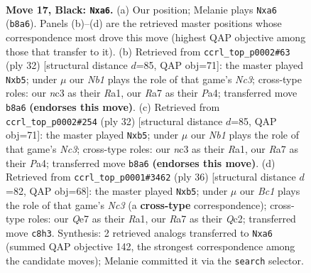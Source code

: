 \documentclass[11pt]{article}
\begin{document}
\clearpage

\begin{figure}[p]\centering
\begin{subfigure}{0.46\textwidth}\centering
\resizebox{\linewidth}{!}{%
\newchessgame
\chessboard[
  setfen={1nb2rk1/r3qpp1/Pp1p1n2/4p2p/P3P3/2NB1N2/2PQ1PPP/R4RK1 b - - 0 17},
  showmover=false,
  pgfstyle=straightmove, color=movearrow, markmove={b8-a6}
]}
\caption{}
\end{subfigure}\hfill
\begin{subfigure}{0.46\textwidth}\centering
\resizebox{\linewidth}{!}{%
\newchessgame
\chessboard[
  setfen={r4rk1/1p2qppp/3nbn2/pp1p4/P2P4/2NBPN1P/2Q2PP1/R4RK1 w - - 0 17},
  showmover=false,
  pgfstyle=straightmove, color=movearrow, markmove={c3-b5}
]}
\caption{}
\end{subfigure}
\\[4pt]
\begin{subfigure}{0.46\textwidth}\centering
\resizebox{\linewidth}{!}{%
\newchessgame
\chessboard[
  setfen={r4rk1/1p2qppp/3nbn2/pp1p4/P2P4/2NBPN1P/2Q2PP1/R4RK1 w - - 0 17},
  showmover=false,
  pgfstyle=straightmove, color=movearrow, markmove={c3-b5}
]}
\caption{}
\end{subfigure}\hfill
\begin{subfigure}{0.46\textwidth}\centering
\resizebox{\linewidth}{!}{%
\newchessgame
\chessboard[
  setfen={r4rk1/pp2q1pp/3nb3/1p3p2/P2Pp3/2N1P3/2QN1PPP/R1R3K1 w - - 0 19},
  showmover=false,
  pgfstyle=straightmove, color=movearrow, markmove={c3-b5}
]}
\caption{}
\end{subfigure}
\caption{\textbf{Move 17, Black: \texttt{Nxa6}.} (a) Our position; Melanie plays \texttt{Nxa6} (\texttt{b8a6}). Panels (b)--(d) are the retrieved master positions whose correspondence most drove this move (highest QAP objective among those that transfer to it). (b) Retrieved from \texttt{ccrl\_top\_p0002\#63} (ply 32) [structural distance $d$=85, QAP obj=71]: the master played \texttt{Nxb5}; under $\mu$ our \emph{Nb1} plays the role of that game's \emph{Nc3}; cross-type roles: our \emph{n}c3 as their \emph{R}a1, our \emph{R}a7 as their \emph{P}a4; transferred move \texttt{b8a6} \textbf{(endorses this move)}. (c) Retrieved from \texttt{ccrl\_top\_p0002\#254} (ply 32) [structural distance $d$=85, QAP obj=71]: the master played \texttt{Nxb5}; under $\mu$ our \emph{Nb1} plays the role of that game's \emph{Nc3}; cross-type roles: our \emph{n}c3 as their \emph{R}a1, our \emph{R}a7 as their \emph{P}a4; transferred move \texttt{b8a6} \textbf{(endorses this move)}. (d) Retrieved from \texttt{ccrl\_top\_p0001\#3462} (ply 36) [structural distance $d$=82, QAP obj=68]: the master played \texttt{Nxb5}; under $\mu$ our \emph{Bc1} plays the role of that game's \emph{Nc3} (a \textbf{cross-type} correspondence); cross-type roles: our \emph{Q}e7 as their \emph{R}a1, our \emph{R}a7 as their \emph{Q}c2; transferred move \texttt{c8h3}. Synthesis: 2 retrieved analogs transferred to \texttt{Nxa6} (summed QAP objective 142, the strongest correspondence among the candidate moves); Melanie committed it via the \texttt{search} selector.}
\label{fig:thought-m33}
\end{figure}
\end{document}
